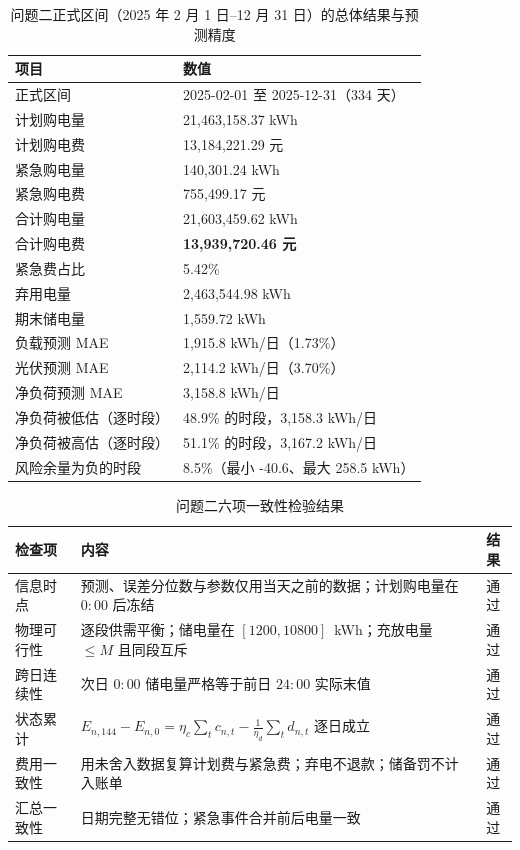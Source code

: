 \begin{table}[htbp]
  \centering
  \caption{问题二正式区间（2025 年 2 月 1 日--12 月 31 日）的总体结果与预测精度}
  \label{tab:p2-totals}
  \small
  \begin{tabular}{ll}
    \toprule
    项目 & 数值 \\
    \midrule
    正式区间 & 2025-02-01 至 2025-12-31（334 天） \\
    计划购电量 & 21,463,158.37 kWh \\
    计划购电费 & 13,184,221.29 元 \\
    紧急购电量 & 140,301.24 kWh \\
    紧急购电费 & 755,499.17 元 \\
    合计购电量 & 21,603,459.62 kWh \\
    合计购电费 & \textbf{13,939,720.46 元} \\
    紧急费占比 & 5.42\% \\
    弃用电量 & 2,463,544.98 kWh \\
    期末储电量 & 1,559.72 kWh \\
    负载预测 MAE & 1,915.8 kWh/日（1.73\%） \\
    光伏预测 MAE & 2,114.2 kWh/日（3.70\%） \\
    净负荷预测 MAE & 3,158.8 kWh/日 \\
    净负荷被低估（逐时段） & 48.9\% 的时段，3,158.3 kWh/日 \\
    净负荷被高估（逐时段） & 51.1\% 的时段，3,167.2 kWh/日 \\
    风险余量为负的时段 & 8.5\%（最小 -40.6、最大 258.5 kWh） \\
    \bottomrule
  \end{tabular}
\end{table}

\begin{table}[htbp]
  \centering
  \caption{问题二六项一致性检验结果}
  \label{tab:p2-checks}
  \small
  \begin{tabular}{llc}
    \toprule
    检查项 & 内容 & 结果 \\
    \midrule
    信息时点 & 预测、误差分位数与参数仅用当天之前的数据；计划购电量在 $0{:}00$ 后冻结 & 通过 \\
    物理可行性 & 逐段供需平衡；储电量在 $[1200,10800]$~kWh；充放电量 $\le M$ 且同段互斥 & 通过 \\
    跨日连续性 & 次日 $0{:}00$ 储电量严格等于前日 $24{:}00$ 实际末值 & 通过 \\
    状态累计 & $E_{n,144}-E_{n,0}=\eta_c\sum_t c_{n,t}-\frac{1}{\eta_d}\sum_t d_{n,t}$ 逐日成立 & 通过 \\
    费用一致性 & 用未舍入数据复算计划费与紧急费；弃电不退款；储备罚不计入账单 & 通过 \\
    汇总一致性 & 日期完整无错位；紧急事件合并前后电量一致 & 通过 \\
    \bottomrule
  \end{tabular}
\end{table}

